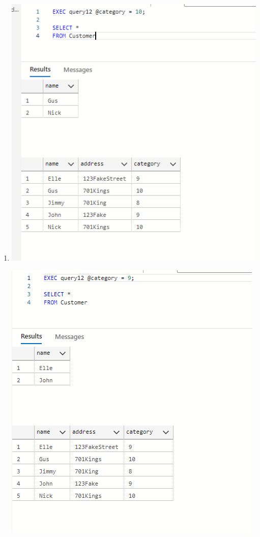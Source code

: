 \documentclass[11pt]{article}
\begin{document}
\begin{enumerate}
\item

\includegraphics[width = \textwidth]{custCat1.png}

\includegraphics[width = \textwidth]{custCat2.png}


\end{enumerate}
\end{document}
